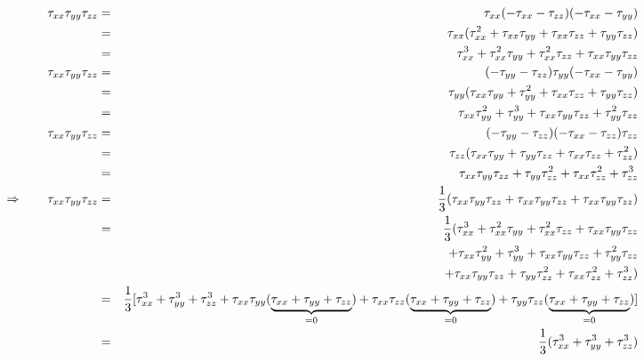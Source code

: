 \begin{eqnarray}
\tau_{xx}\tau_{yy}\tau_{zz}
&=&\tau_{xx}(-\tau_{xx}-\tau_{zz})(-\tau_{xx}-\tau_{yy}) \nonumber\\
&=&\tau_{xx}(\tau_{xx}^2+\tau_{xx}\tau_{yy}+\tau_{xx}\tau_{zz}+\tau_{yy}\tau_{zz})\nonumber\\
&=&\tau_{xx}^3+\tau_{xx}^2\tau_{yy}+\tau_{xx}^2\tau_{zz}+\tau_{xx}\tau_{yy}\tau_{zz}\nonumber\\
\tau_{xx}\tau_{yy}\tau_{zz}
&=& (-\tau_{yy}-\tau_{zz})\tau_{yy}(-\tau_{xx}-\tau_{yy})\nonumber\\
&=& \tau_{yy}(\tau_{xx}\tau_{yy} + \tau_{yy}^2 + \tau_{xx}\tau_{zz} + \tau_{yy}\tau_{zz} )\nonumber\\
&=& \tau_{xx}\tau_{yy}^2 + \tau_{yy}^3 + \tau_{xx}\tau_{yy}\tau_{zz} + \tau_{yy}^2\tau_{zz} \nonumber\\
\tau_{xx}\tau_{yy}\tau_{zz}
&=& (-\tau_{yy}-\tau_{zz})(-\tau_{xx}-\tau_{zz}) \tau_{zz}\nonumber\\
&=& \tau_{zz}(\tau_{xx}\tau_{yy}+\tau_{yy}\tau_{zz}+\tau_{xx}\tau_{zz} + \tau_{zz}^2  ) \nonumber\\
&=& \tau_{xx}\tau_{yy}\tau_{zz}+\tau_{yy}\tau_{zz}^2+\tau_{xx}\tau_{zz}^2 + \tau_{zz}^3  \nonumber\\
\Rightarrow \qquad \tau_{xx}\tau_{yy}\tau_{zz} 
&=&\frac13
(\tau_{xx}\tau_{yy}\tau_{zz}+
\tau_{xx}\tau_{yy}\tau_{zz}+
\tau_{xx}\tau_{yy}\tau_{zz}
)\nonumber\\
&=&\frac13(\tau_{xx}^3+\tau_{xx}^2\tau_{yy}+\tau_{xx}^2\tau_{zz}+\tau_{xx}\tau_{yy}\tau_{zz} \nonumber\\
&&+ \tau_{xx}\tau_{yy}^2 + \tau_{yy}^3 + \tau_{xx}\tau_{yy}\tau_{zz} + \tau_{yy}^2\tau_{zz} \nonumber\\
&&+ \tau_{xx}\tau_{yy}\tau_{zz}+\tau_{yy}\tau_{zz}^2+\tau_{xx}\tau_{zz}^2 + \tau_{zz}^3 ) \nonumber\\
&=& \frac13 [\tau_{xx}^3+\tau_{yy}^3+\tau_{zz}^3 
+\tau_{xx}\tau_{yy}(\underbrace{ \tau_{xx}+\tau_{yy}+\tau_{zz}}_{=0}) 
+  \tau_{xx}\tau_{zz}(\underbrace{ \tau_{xx}+\tau_{yy}+\tau_{zz}}_{=0}) 
+  \tau_{yy}\tau_{zz}(\underbrace{ \tau_{xx}+\tau_{yy}+\tau_{zz}}_{=0}) ] \nonumber\\
&=& \frac13 (\tau_{xx}^3+\tau_{yy}^3+\tau_{zz}^3)  \nonumber
\end{eqnarray}


